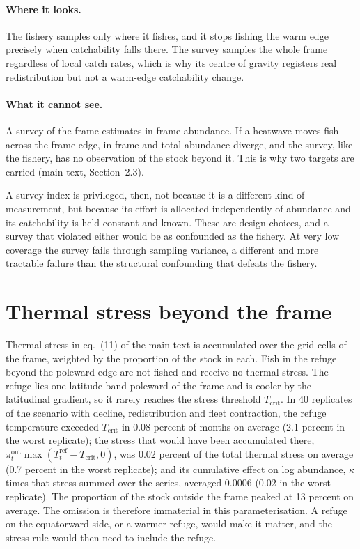 \documentclass[11pt,a4paper]{article}
\newcommand{\vt}[1]{\text{#1}}
\begin{document}
\paragraph{Where it looks.} The fishery samples only where it fishes, and it stops fishing the warm edge precisely when catchability falls there. The survey samples the whole frame regardless of local catch rates, which is why its centre of gravity registers real redistribution but not a warm-edge catchability change.

\paragraph{What it cannot see.} A survey of the frame estimates in-frame abundance. If a heatwave moves fish across the frame edge, in-frame and total abundance diverge, and the survey, like the fishery, has no observation of the stock beyond it. This is why two targets are carried (main text, Section~2.3).

A survey index is privileged, then, not because it is a different kind of measurement, but because its effort is allocated independently of abundance and its catchability is held constant and known. These are design choices, and a survey that violated either would be as confounded as the fishery. At very low coverage the survey fails through sampling variance, a different and more tractable failure than the structural confounding that defeats the fishery.

\section{Thermal stress beyond the frame}
\label{sec:refuge-stress}

Thermal stress in eq.~(11) of the main text is accumulated over the grid cells of the frame, weighted by the proportion of the stock in each. Fish in the refuge beyond the poleward edge are not fished and receive no thermal stress. The refuge lies one latitude band poleward of the frame and is cooler by the latitudinal gradient, so it rarely reaches the stress threshold $T_{\vt{crit}}$. In 40 replicates of the scenario with decline, redistribution and fleet contraction, the refuge temperature exceeded $T_{\vt{crit}}$ in 0.08 percent of months on average (2.1 percent in the worst replicate); the stress that would have been accumulated there, $\pi^{\vt{out}}_t\max(T^{\vt{ref}}_t - T_{\vt{crit}}, 0)$, was 0.02 percent of the total thermal stress on average (0.7 percent in the worst replicate); and its cumulative effect on log abundance, $\kappa$ times that stress summed over the series, averaged 0.0006 (0.02 in the worst replicate). The proportion of the stock outside the frame peaked at 13 percent on average. The omission is therefore immaterial in this parameterisation. A refuge on the equatorward side, or a warmer refuge, would make it matter, and the stress rule would then need to include the refuge.
\end{document}

